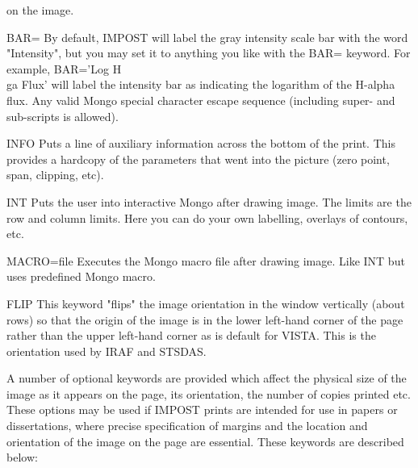 \begin{example}
{          on the image. }
  \item[BAR=]{By default, IMPOST will label the gray intensity scale
          bar with the word "Intensity", but you may set it to 
          anything you like with the BAR= keyword.  For example,
          BAR='Log H\\ga Flux' will label the intensity bar as
          indicating the logarithm of the H-alpha flux.  Any valid
          Mongo special character escape sequence (including 
          super- and sub-scripts is allowed).}
  \item[INFO]{Puts a line of auxiliary information across the bottom of
          the print.  This provides a hardcopy of the parameters
          that went into the picture (zero point, span, clipping, etc).}
  \item[INT]{Puts the user into interactive Mongo after drawing image. The
          limits are the row and column limits. Here you can do your
          own labelling, overlays of contours, etc.}
  \item[MACRO=file]{Executes the Mongo macro file after drawing image. Like
          INT but uses predefined Mongo macro.}
  \item[FLIP]{This keyword "flips" the image orientation in the window
          vertically (about rows) so that the origin of the image is
          in the lower left-hand corner of the page rather than the
          upper left-hand corner as is default for VISTA.  This is
          the orientation used by IRAF and STSDAS.}
\end{example}


A number of optional keywords are provided which affect the physical size
of the image as it appears on the page, its orientation, the number of
copies printed etc.  These options may be used if IMPOST prints are
intended for use in papers or dissertations, where precise specification of
margins and the location and orientation of the image on the page are
essential.  These keywords are described below:

